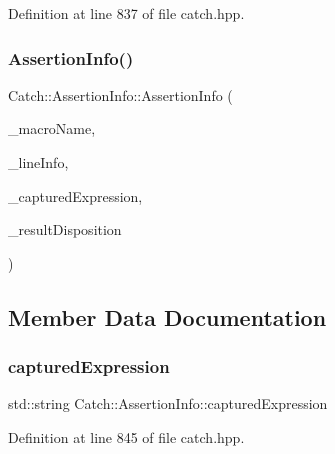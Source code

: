Definition at line 837 of file catch.\+hpp.

\hypertarget{struct_catch_1_1_assertion_info_aaf6cc3eebd40391e54d37ed42953c73f}{}\label{struct_catch_1_1_assertion_info_aaf6cc3eebd40391e54d37ed42953c73f} 
\subsubsection{\texorpdfstring{Assertion\+Info()}{AssertionInfo()}\hspace{0.1cm}{\footnotesize\ttfamily [2/2]}}
{\footnotesize\ttfamily Catch\+::\+Assertion\+Info\+::\+Assertion\+Info (\begin{DoxyParamCaption}\item[{std\+::string const \&}]{\+\_\+macro\+Name,  }\item[{\hyperlink{struct_catch_1_1_source_line_info}{Source\+Line\+Info} const \&}]{\+\_\+line\+Info,  }\item[{std\+::string const \&}]{\+\_\+captured\+Expression,  }\item[{\hyperlink{struct_catch_1_1_result_disposition_a3396cad6e2259af326b3aae93e23e9d8}{Result\+Disposition\+::\+Flags}}]{\+\_\+result\+Disposition }\end{DoxyParamCaption})}



\subsection{Member Data Documentation}
\hypertarget{struct_catch_1_1_assertion_info_af7c1d3cbfa346e9a303030fa0ef0cb54}{}\label{struct_catch_1_1_assertion_info_af7c1d3cbfa346e9a303030fa0ef0cb54} 
\subsubsection{\texorpdfstring{captured\+Expression}{capturedExpression}}
{\footnotesize\ttfamily std\+::string Catch\+::\+Assertion\+Info\+::captured\+Expression}



Definition at line 845 of file catch.\+hpp.

